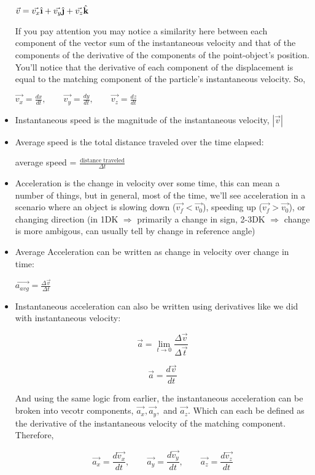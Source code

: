 \documentclass[openany]{book}
\newcommand{\ihat}{\hat{\textbf{\i}}}
\newcommand{\jhat}{\hat{\textbf{\j}}}
\newcommand{\khat}{\hat{\textbf{k}}}
\begin{document}
\begin{itemize}
    $\vec{v} = {\vec{v_x}}{\ihat} + {\vec{v_y}}{\jhat} + {\vec{v_z}}{\khat}$

    If you pay attention you may notice a similarity here between each component of the vector sum of the instantaneous velocity and that of the components of the derivative of the components of the point-object's position. You'll notice that the derivative of each component of the displacement is equal to the matching component of the particle's instantaneous velocity. So, 

    $\vec{v_x} = \frac{dx}{dt}, \qquad \vec{v_y} = \frac{dy}{dt}, \qquad \vec{v_z} = \frac{dz}{dt}$

    \item Instantaneous speed is the magnitude of the instantaneous velocity, $|\vec{v}|$
    \item Average speed is the total distance traveled over the time elapsed:
    
    average speed = $\frac{\text{distance traveled}}{\Delta t}$

    \item Acceleration is the change in velocity over some time, this can mean a number of things, but in general, most of the time, we'll see acceleration in a scenario where an object is slowing down ($\vec{v_f} < \vec{v_0}$), speeding up ($\vec{v_f} > \vec{v_0}$), or changing direction (in 1DK $\Rightarrow$ primarily a change in sign, 2-3DK $\Rightarrow$ change is more ambigous, can usually tell by change in reference angle)
    \item Average Acceleration can be written as change in velocity over change in time:
    
    $\vec{a_{avg}} = \frac{\Delta \vec{v}}{\Delta t}$

    \item Instantaneous acceleration can also be written using derivatives like we did with instantaneous velocity:
    
    \[\vec{a} = \lim_{t\to0} \frac{\Delta\vec{v}}{\Delta\vec{t}} \]


    \[\vec{a} = \frac{d\vec{v}}{dt} \]

    And using the same logic from earlier, the instantaneous acceleration can be broken into vecotr components, $\vec{a_x}, \vec{a_y}, $ and $\vec{a_z}$. Which can each be defined as the derivative of the instantaneous velocity of the matching component. Therefore,

    \[\vec{a_x} = \frac{d\vec{v_x}}{dt}, \qquad \vec{a_y} = \frac{d\vec{v_y}}{dt}, \qquad \vec{a_z} = \frac{d\vec{v_z}}{dt} \]

\end{itemize}
    
\end{document}
